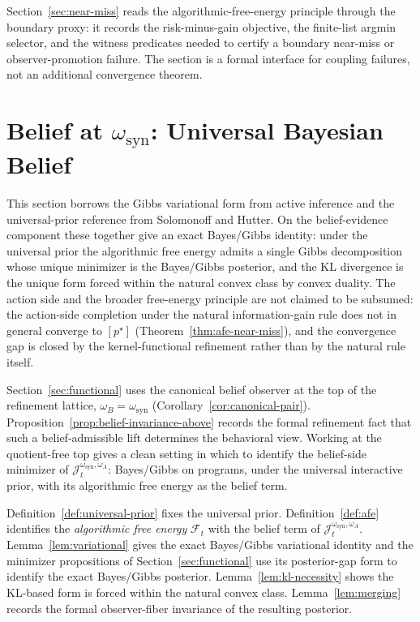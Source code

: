 \documentclass[11pt]{article}
\theoremstyle{definition}
\theoremstyle{remark}
\theoremstyle{plain}
\theoremstyle{definition}
\newcommand{\Fcal}{\mathcal{F}}
\begin{document}
Section~\ref{sec:near-miss} reads the algorithmic-free-energy principle through the boundary proxy: it records the risk-minus-gain objective, the finite-list argmin selector, and the witness predicates needed to certify a boundary near-miss or observer-promotion failure. The section is a formal interface for coupling failures, not an additional convergence theorem.

\section{Belief at $\omega_{\mathrm{syn}}$: Universal Bayesian Belief}
\label{sec:belief}

This section borrows the Gibbs variational form from active inference and the universal-prior reference from Solomonoff and Hutter. On the belief-evidence component these together give an exact Bayes/Gibbs identity: under the universal prior the algorithmic free energy admits a single Gibbs decomposition whose unique minimizer is the Bayes/Gibbs posterior, and the KL divergence is the unique form forced within the natural convex class by convex duality. The action side and the broader free-energy principle are not claimed to be subsumed: the action-side completion under the natural information-gain rule does not in general converge to $[p^\star]$ (Theorem~\ref{thm:afe-near-miss}), and the convergence gap is closed by the kernel-functional refinement rather than by the natural rule itself.

Section~\ref{sec:functional} uses the canonical belief observer at the top of the refinement lattice, $\omega_B=\omega_{\mathrm{syn}}$ (Corollary~\ref{cor:canonical-pair}). Proposition~\ref{prop:belief-invariance-above} records the formal refinement fact that such a belief-admissible lift determines the behavioral view. Working at the quotient-free top gives a clean setting in which to identify the belief-side minimizer of $\mathcal J_t^{\omega_{\mathrm{syn}},\omega_A}$: Bayes/Gibbs on programs, under the universal interactive prior, with its algorithmic free energy as the belief term.

Definition~\ref{def:universal-prior} fixes the universal prior. Definition~\ref{def:afe} identifies the \emph{algorithmic free energy} $\Fcal_t$ with the belief term of $\mathcal J_t^{\omega_{\mathrm{syn}},\omega_A}$. Lemma~\ref{lem:variational} gives the exact Bayes/Gibbs variational identity and the minimizer propositions of Section~\ref{sec:functional} use its posterior-gap form to identify the exact Bayes/Gibbs posterior. Lemma~\ref{lem:kl-necessity} shows the KL-based form is forced within the natural convex class. Lemma~\ref{lem:merging} records the formal observer-fiber invariance of the resulting posterior.
\end{document}
